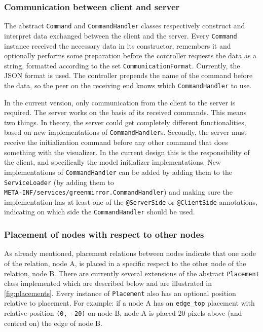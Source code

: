 \documentclass[a4paper]{article}
\begin{document}
	\subsubsection{Communication between client and server}\label{subsubsec:communication}
	The abstract \lstinline{Command} and \lstinline{CommandHandler} classes respectively construct and interpret data exchanged between the client and the server. Every \lstinline{Command} instance received the necessary data in its constructor, remembers it and optionally performs some preparation before the controller requests the data as a string, formatted according to the set \lstinline{CommunicationFormat}. Currently, the JSON format is used. The controller prepends the name of the command before the data, so the peer on the receiving end knows which \lstinline{CommandHandler} to use.
	
	In the current version, only communication from the client to the server is required. The server works on the basis of its received commands. This means two things. In theory, the server could get completely different functionalities, based on new implementations of \lstinline{CommandHandler}s. Secondly, the server must receive the initialization command before any other command that does something with the visualizer. In the current design this is the responsibility of the client, and specifically the model initializer implementations. New implementations of \lstinline{CommandHandler} can be added by adding them to the \lstinline{ServiceLoader} (by adding them to \\ 
	\lstinline{META-INF/services/greenmirror.CommandHandler}) and making sure the implementation has at least one of the \lstinline{@ServerSide} or \lstinline{@ClientSide} annotations, indicating on which side the \lstinline{CommandHandler} should be used.
	
	
	
	\subsubsection{Placement of nodes with respect to other nodes}\label{subsubsec:placement}
	As already mentioned, placement relations between nodes indicate that one node of the relation, node A, is placed in a specific respect to the other node of the relation, node B. There are currently several extensions of the abstract \lstinline{Placement} class implemented which are described below and are illustrated in \cref{fig:placements}. Every instance of \lstinline{Placement} also has an optional  position relative to placement. For example: if a node A has an \lstinline{edge_top} placement with relative position \lstinline{(0, -20)} on node B, node A is placed 20 pixels above (and centred on) the edge of node B.
	
\end{document}
